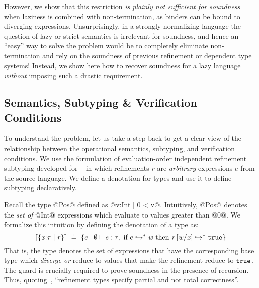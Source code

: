 However, we show that this restriction \emph{is plainly not sufficient for soundness} 
when laziness is combined with non-termination, 
as binders can be bound to diverging expressions. 
Unsurprisingly, in a strongly
normalizing language the question of lazy or strict semantics is irrelevant for soundness, and hence 
an ``easy'' way to solve the problem would be to completely eliminate non-termination and rely on the soundness
of previous refinement or dependent type systems! Instead, we show here how to 
recover soundness for a lazy language \emph{without} imposing such a drastic requirement. 


\subsection{Semantics, Subtyping \& Verification Conditions} \label{sec:den-sem}

To understand the problem, let us take a step 
back to get a clear view of the relationship 
between the operational semantics, subtyping,
and verification conditions.
%
We use the formulation of evaluation-order 
independent refinement subtyping developed 
for \hlang~\cite{Knowles10} in which 
refinements $r$ are \emph{arbitrary} expressions $e$ from the source language.
We define a denotation for types and use it 
to define subtyping declaratively.

%
Recall the type @Pos@ defined as {@{v:Int | 0 < v}@}.
Intuitively, @Pos@ denotes the \emph{set of} @Int@ 
expressions which evaluate to values greater than @0@.
%
We formalize this intuition by defining the denotation
of a type as:
$$[\![{\{ \mathtt{\mathit{x}}\text{:}\mathtt{\mathit{\tau}^{}} \mid \mathtt{\mathit{r}} \}}]\!] \ \doteq\  \{e \mid \emptyset \vdash e : \mathit{\tau}, \mbox{ if } e \hookrightarrow_{}^{*} \mathit{w} \mbox{ then } {\ensuremath{\mathit{r}}}\left[\mathit{w}/\mathit{x}\right] \hookrightarrow_{}^{*} \mathtt{true} \}$$
That is, the type denotes the set of expressions \mie that have
the corresponding base type \typ which \emph{diverge or} reduce 
to values that make the refinement reduce to $\mathtt{true}$. 
%
The guard \goesto{\mie}{\val} is crucially required to prove soundness in the presence of recursion.
Thus, quoting~\cite{Knowles10}, ``refinement types specify partial and not total correctness''. 


